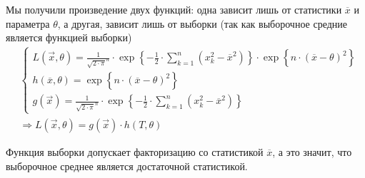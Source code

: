 \begin{example}
  Мы получили произведение двух функций:
  одна зависит лишь от статистики $\overline{x}$ и параметра $\theta$,
  а другая, зависит лишь от выборки (так как выборочное средние
  является функцией выборки)
  \begin{align*}
      &\begin{cases}
      L\left( \vec{x}, \theta \right)
      = \frac{1}{\sqrt{2 \cdot \pi}^n}
      \cdot \exp{\left\{ -\frac{1}{2}
    \cdot \sum_{k=1}^n \left( x_k^2 - \overline{x}^2 \right)
        \right\}}
      \cdot \exp{\left\{ n \cdot \left( \overline{x}
    - \theta \right)^2 \right\}} \\
      h\left( \overline{x}, \theta \right)
      = \exp{\left\{ n \cdot \left( \overline{x}
    - \theta \right)^2 \right\}}\\
      g\left( \vec{x} \right)
      = \frac{1}{\sqrt{2 \cdot \pi}^n}
      \cdot \exp{\left\{ -\frac{1}{2}
    \cdot \sum_{k=1}^n \left( x_k^2 - \overline{x}^2 \right)
        \right\}}
      \end{cases} \\
      &\Rightarrow
      L\left( \vec{x}, \theta \right)
      = g\left( \vec{x} \right) \cdot h\left( T, \theta \right)
  \end{align*}

  Функция выборки допускает факторизацию со статистикой $\overline{x}$,
  а это значит, что выборочное среднее является достаточной статистикой.
\end{example}
